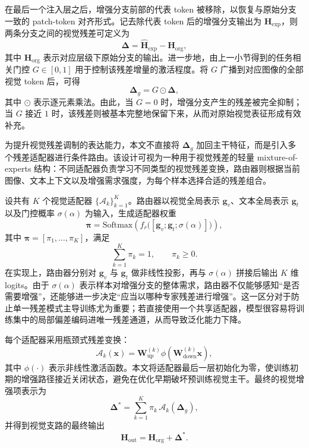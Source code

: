 \documentclass[journal]{IEEEtran}
\begin{document}
在最后一个注入层之后，增强分支前部的代表 token 被移除，以恢复与原始分支一致的 patch-token 对齐形式。记去除代表 token 后的增强分支输出为 $\hat{\mathbf{H}}_{\mathrm{exp}}$，则两条分支之间的视觉残差可定义为
\begin{equation}
\mathbf{\Delta}=\hat{\mathbf{H}}_{\mathrm{exp}}-\mathbf{H}_{\mathrm{org}},
\end{equation}
其中 $\mathbf{H}_{\mathrm{org}}$ 表示对应层级下原始分支的输出。进一步地，由上一小节得到的任务相关门控 $G\in[0,1]$ 用于控制该残差增量的激活程度。将 $G$ 广播到对应图像的全部视觉 token 后，可得
\begin{equation}
\mathbf{\Delta}_g = G \odot \mathbf{\Delta},
\end{equation}
其中 $\odot$ 表示逐元素乘法。由此，当 $G=0$ 时，增强分支产生的残差被完全抑制；当 $G$ 接近 $1$ 时，该残差则被基本完整地保留下来，从而对原始视觉表征形成有效补充。

为提升视觉残差调制的表达能力，本文不直接将 $\mathbf{\Delta}_g$ 加回主干特征，而是引入多个残差适配器进行条件路由。该设计可视为一种用于视觉残差的轻量 mixture-of-experts 结构：不同适配器负责学习不同类型的视觉残差变换，路由器则根据当前图像、文本上下文以及增强需求强度，为每个样本选择合适的残差组合。\cite{shazeer2017outrageously}\cite{houlsby2019parameter}

设共有 $K$ 个视觉适配器 $\{\mathcal{A}_k\}_{k=1}^K$。路由器以视觉全局表示 $\mathbf{g}_v$、文本全局表示 $\mathbf{g}_t$ 以及门控概率 $\sigma(\alpha)$ 为输入，生成适配器权重
\begin{equation}
\boldsymbol{\pi}
=
\mathrm{Softmax}\left(
f_r\big([\mathbf{g}_v;\mathbf{g}_t;\sigma(\alpha)]\big)
\right),
\end{equation}
其中 $\boldsymbol{\pi}=[\pi_1,\ldots,\pi_K]$，满足
\begin{equation}
\sum_{k=1}^{K}\pi_k=1,\qquad \pi_k\ge 0.
\end{equation}
在实现上，路由器分别对 $\mathbf{g}_v$ 与 $\mathbf{g}_t$ 做非线性投影，再与 $\sigma(\alpha)$ 拼接后输出 $K$ 维 logits。由于 $\sigma(\alpha)$ 表示样本对增强分支的整体需求，路由器不仅能够感知“是否需要增强”，还能够进一步决定“应当以哪种专家残差进行增强”。这一区分对于防止单一残差模式主导训练尤为重要；若直接使用一个共享适配器，模型很容易将训练集中的局部偏差编码进唯一残差通道，从而导致泛化能力下降。

每个适配器采用瓶颈式残差变换：
\begin{equation}
\mathcal{A}_k(\mathbf{x})
=
\mathbf{W}^{(k)}_{\mathrm{up}}
\phi\!\left(
\mathbf{W}^{(k)}_{\mathrm{down}}\mathbf{x}
\right),
\end{equation}
其中 $\phi(\cdot)$ 表示非线性激活函数。本文将适配器最后一层初始化为零，使训练初期的增强路径接近关闭状态，避免在优化早期破坏预训练视觉主干。最终的视觉增强项表示为
\begin{equation}
\mathbf{\Delta}^{*}
=
\sum_{k=1}^{K}\pi_k\,\mathcal{A}_k(\mathbf{\Delta}_g),
\end{equation}
并得到视觉支路的最终输出
\begin{equation}
\mathbf{H}_{\mathrm{out}}
=
\mathbf{H}_{\mathrm{org}}
+
\mathbf{\Delta}^{*}.
\end{equation}
\end{document}
